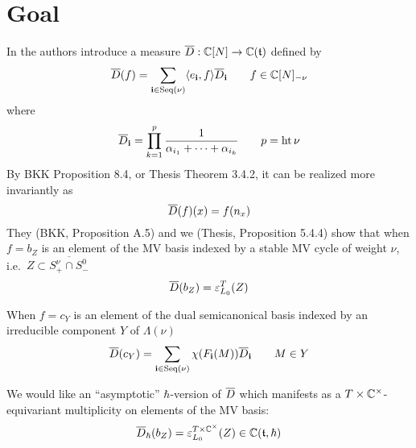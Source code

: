 \documentclass[11pt]{article}
\begin{document}
% 
\section{Goal}
In \cite{baumann2019mirkovic} the authors introduce a measure $\overline{D}:\mathbb C[N]\to\mathbb C(\mathfrak t)$ defined by 
\begin{equation}
    \label{eq:defbard}
    \overline{D}(f) = \sum_{\mathbf{i}\in\operatorname{Seq}(\nu)}\langle e_{\mathbf{i}},f\rangle\overline{D}_{\mathbf{i}}\qquad f \in \mathbb C[N]_{-\nu}
\end{equation}
where 
\begin{equation}
    \label{eq:bardi}
    \overline{D}_{\mathbf{i}} = \prod_{k=1}^p\frac{1}{\alpha_{i_1} + \cdots + \alpha_{i_k}} \qquad p = \operatorname{ht} \nu 
\end{equation}
By BKK Proposition 8.4, or Thesis Theorem 3.4.2, it can be realized more invariantly as 
\begin{equation}
    \label{eq:invbard}
     \overline{D}(f)(x) = f(n_x)
\end{equation}
They (BKK, Proposition A.5) and we (Thesis, Proposition 5.4.4) show that when $f = b_Z$ is an element of the MV basis indexed by a stable MV cycle of weight $\nu$, i.e.\ $Z\subset \overline{S^\nu_+\cap S^0_-}$
\begin{equation}
    \label{eq:bardaseqm}
    \overline{D}(b_Z) = \varepsilon_{L_0}^T (Z) 
\end{equation}

When $f = c_Y$ is an element of the dual semicanonical basis indexed by an irreducible component $Y$ of $\Lambda(\nu)$
\begin{equation}
    \label{eq:bardaseu} %
    \barD(c_Y) = \sum_{\vi\in\Seq(\nu)}\chi(F_{\vi}(M))\barD_{\vi} \qquad M \in Y
\end{equation}

We would like an ``asymptotic'' $\hbar$-version of $\overline{D}$ which manifests as a $T\times\mathbb C^\times$-equivariant multiplicity on elements of the MV basis:
$$
\overline{D}_\hbar(b_Z) = \varepsilon_{L_0}^{T\times\mathbb C^\times} (Z) \in \mathbb C(\mathfrak t,\hbar)
$$
\end{document}
